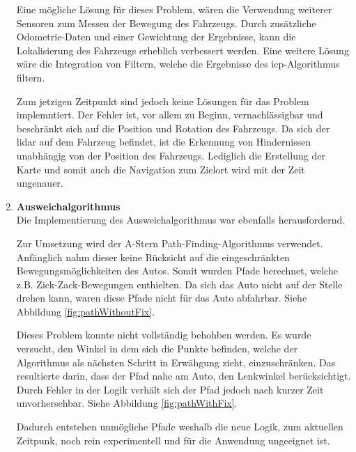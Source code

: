 \begin{enumerate}[leftmargin=*]
    Eine mögliche Lösung für dieses Problem, wären die Verwendung weiterer Sensoren zum Messen der Bewegung des Fahrzeugs.
    Durch zusätzliche Odometrie-Daten und einer Gewichtung der Ergebnisse, kann die Lokalisierung des Fahrzeugs erheblich verbessert werden.
    Eine weitere Lösung wäre die Integration von Filtern, welche die Ergebnisse des \ac{icp}-Algorithmus filtern.

    Zum jetzigen Zeitpunkt sind jedoch keine Lösungen für das Problem implemntiert.
    Der Fehler ist, vor allem zu Beginn, vernachlässigbar und beschränkt sich auf die Position und Rotation des Fahrzeugs.
    Da sich der \ac{lidar} auf dem Fahrzeug befindet, ist die Erkennung von Hindernissen unabhängig von der Position des Fahrzeugs.
    Lediglich die Erstellung der Karte und somit auch die Navigation zum Zielort wird mit der Zeit ungenauer.

    \item \textbf{Ausweichalgorithmus} \\
    Die Implementierung des Ausweichalgorithmus war ebenfalls herausfordernd.
    
    Zur Umsetzung wird der A-Stern Path-Finding-Algorithmus verwendet.
    Anfänglich nahm dieser keine Rücksicht auf die eingeschränkten Bewegungsmöglichkeiten des Autos.
    Somit wurden Pfade berechnet, welche z.B. Zick-Zack-Bewegungen enthielten.
    Da sich das Auto nicht auf der Stelle drehen kann, waren diese Pfade nicht für das Auto abfahrbar.
    Siehe Abbildung \ref{fig:pathWithoutFix}.

    Dieses Problem konnte nicht vollständig behohben werden.
    Es wurde versucht, den Winkel in dem sich die Punkte befinden, welche der Algorithmus als nächsten Schritt in Erwähgung zieht, einzuschränken.
    Das resultierte darin, dass der Pfad nahe am Auto, den Lenkwinkel berücksichtigt.
    Durch Fehler in der Logik verhält sich der Pfad jedoch nach kurzer Zeit unvorhersehbar.
    Siehe Abbildung \ref{fig:pathWithFix}.

    Dadurch entstehen unmögliche Pfade weshalb die neue Logik, zum aktuellen Zeitpunk, noch rein experimentell und für die Anwendung ungeeignet ist.


\end{enumerate}
